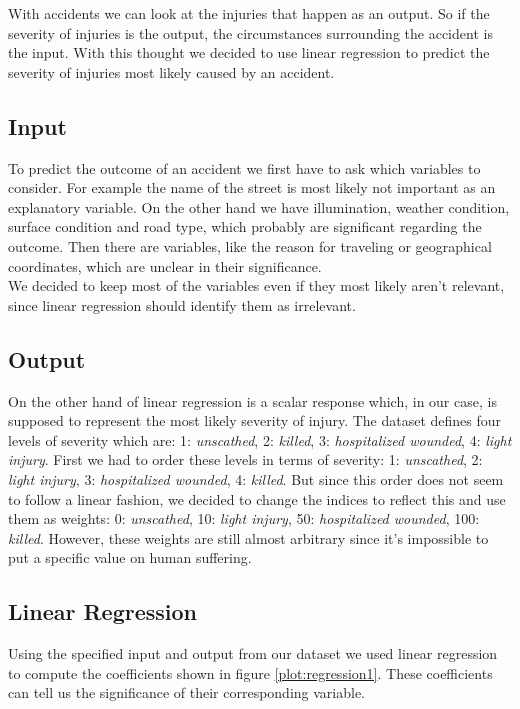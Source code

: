 \documentclass{article}
\begin{document}
\iffalse
With accidents we can look at the injuries that happen as an output. So if the severity of injuries is the output, the circumstances surrounding the accident is the input. With this thought we decided to use linear regression to predict the severity of injuries most likely caused by an accident.

\subsection{Input}

To predict the outcome of an accident we first have to ask which variables to consider. For example the name of the street is most likely not important as an explanatory variable. On the other hand we have illumination, weather condition, surface condition and road type, which probably are significant regarding the outcome. Then there are variables, like the reason for traveling or geographical coordinates, which are unclear in their significance.\\
We decided to keep most of the variables even if they most likely aren't relevant, since linear regression should identify them as irrelevant.

\subsection{Output}

On the other hand of linear regression is a scalar response which, in our case, is supposed to represent the most likely severity of injury. The dataset defines four levels of severity which are: 1: \textit{unscathed}, 2: \textit{killed}, 3: \textit{hospitalized wounded}, 4: \textit{light injury}. First we had to order these levels in terms of severity: 1: \textit{unscathed}, 2: \textit{light injury}, 3: \textit{hospitalized wounded}, 4: \textit{killed}.  But since this order does not seem to follow a linear fashion, we decided to change the indices to reflect this and use them as weights: 0: \textit{unscathed}, 10: \textit{light injury}, 50: \textit{hospitalized wounded}, 100: \textit{killed}. However, these weights are still almost arbitrary since it's impossible to put a specific value on human suffering.

\subsection{Linear Regression}

Using the specified input and output from our dataset we used linear regression to compute the coefficients shown in figure \ref{plot:regression1}. These coefficients can tell us the significance of their corresponding variable.
\end{document}
